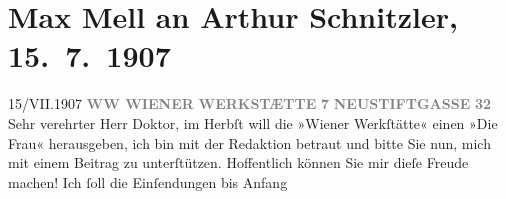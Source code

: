 

         
         \renewcommand{\erwaehntePersonen}{Personen: Josef Hoffmann, Maria Mell, Olga Schnitzler, Friedrich Wärndorfer}
         \renewcommand{\erwaehnteInstitutionen}{Institutionen: Wiener Werkstätte}
         \renewcommand{\erwaehnteOrte}{Orte: Neustiftgasse, Ungarn, VII., Neubau, Wien, Wittelsbachstraße}
         \renewcommand{\erwaehnteWerke}{Werke: Almanach der Wiener Werkstätte}
               \section[Max Mell an Arthur Schnitzler, 15. 7. 1907]{ Max Mell an Arthur Schnitzler, 15. 7. 1907}\nopagebreak{}\rehead{ }\begin{ledgroupsized}[t]{13cm}\normalsize\beginnumbering \toendnotes[C]{\smallbreak\pagebreak[2]} 
\toendnotes[C]{\smallbreak}\pstart
           \noindent{}{\pb}15/VII.\hfill 1907\pend
           \pstart
           \centering{}\textcolor{gray}{\textbf{WW WIENER}}\pend
           \pstart
           \noindent{}\centering{}\textcolor{gray}{\textbf{WERKSTÆTTE}}\pend
           \pstart
           \noindent{}\centering{}\textcolor{gray}{\textbf{7}}\pend
           \pstart
           \noindent{}\centering{}\textcolor{gray}{\textbf{NEUSTIFTGASSE}}\pend
           \pstart
           \noindent{}\centering{}\textcolor{gray}{\textbf{32}}\pend
           \pstart{}Sehr verehrter Herr Doktor,\pend\pstart
           im Herbſt will die »Wiener Werkſtätte« einen
                  \label{K_L01692-1v}\label{K_L01692-1h} »Die Frau« herausgeben, ich bin mit der
               Redaktion betraut und bitte Sie nun, mich mit einem Beitrag zu unterſtützen.
               Hoffentlich können Sie mir dieſe Freude machen! Ich ſoll die Einſendungen bis Anfang

\end{ledgroupsized}
